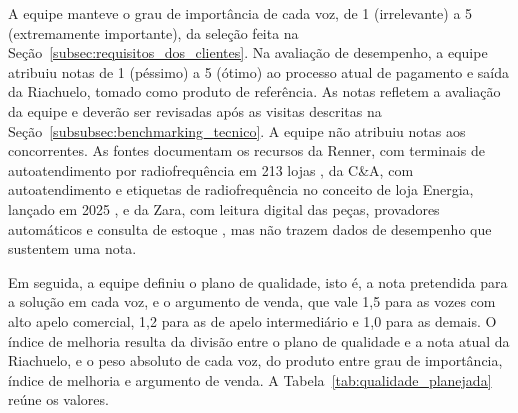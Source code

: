 A equipe manteve o grau de importância de cada voz, de 1 (irrelevante) a 5 (extremamente importante), da seleção feita na Seção~\ref{subsec:requisitos_dos_clientes}. Na avaliação de desempenho, a equipe atribuiu notas de 1 (péssimo) a 5 (ótimo) ao processo atual de pagamento e saída da Riachuelo, tomado como produto de referência. As notas refletem a avaliação da equipe e deverão ser revisadas após as visitas descritas na Seção~\ref{subsubsec:benchmarking_tecnico}. A equipe não atribuiu notas aos concorrentes. As fontes documentam os recursos da Renner, com terminais de autoatendimento por radiofrequência em 213 lojas \cite{consumidormoderno2025renner}, da C\&A, com autoatendimento e etiquetas de radiofrequência no conceito de loja Energia, lançado em 2025 \cite{brazileconomy2025cea}, e da Zara, com leitura digital das peças, provadores automáticos e consulta de estoque \cite{infomoney2023zara}, mas não trazem dados de desempenho que sustentem uma nota.

Em seguida, a equipe definiu o plano de qualidade, isto é, a nota pretendida para a solução em cada voz, e o argumento de venda, que vale 1,5 para as vozes com alto apelo comercial, 1,2 para as de apelo intermediário e 1,0 para as demais. O índice de melhoria resulta da divisão entre o plano de qualidade e a nota atual da Riachuelo, e o peso absoluto de cada voz, do produto entre grau de importância, índice de melhoria e argumento de venda. A Tabela~\ref{tab:qualidade_planejada} reúne os valores.

